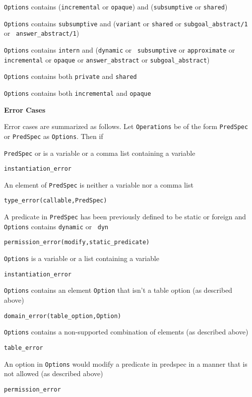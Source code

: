 \begin{description}
\item {\tt Options} contains ({\tt incremental} or {\tt opaque}) and
  ({\tt subsumptive} or {\tt shared})

\item {\tt Options} contains {\tt subsumptive} and ({\tt variant} or
  {\tt shared} or {\tt subgoal\_abstract/1} or {\tt
    answer\_abstract/1})

\item {\tt Options} contains {\tt intern} and ({\tt dynamic} or {\tt
subsumptive} or {\tt approximate} or {\tt incremental} or {\tt opaque}
or {\tt answer\_abstract} or {\tt subgoal\_abstract})
%
\item {\tt Options} contains both {\tt private} and {\tt shared}
%
\item {\tt Options} contains both {\tt incremental} and {\tt opaque}
\ei

{\bf Error Cases}

Error cases are summarized as follows.  Let {\tt Operations} be of the
form {\tt PredSpec} or {\tt PredSpec} as {\tt Options}.  Then if 
%
\bi
\item {\tt PredSpec} or is a variable or a comma list containing a variable
\bi
\item {\tt instantiation\_error}
\ei
\item An element of {\tt PredSpec} is neither a variable nor a comma
  list
\bi
\item 	{\tt type\_error(callable,PredSpec)}
\ei
\item A predicate in {\tt PredSpec} has been previously defined to be
  static or foreign and {\tt Options} contains {\tt dynamic} or {\tt
    dyn}
\bi
\item 	{\tt permission\_error(modify,static\_predicate)}
\ei
\item {\tt Options} is a variable or a list containing a variable
\bi
\item {\tt instantiation\_error}
\ei
\item {\tt Options} contains an element {\tt Option} that isn't a table option (as described above)
\bi
\item {\tt domain\_error(table\_option,Option)}
\ei
\item {\tt Options} contains a non-supported combination of  elements (as described above)
\bi
\item {\tt table\_error}
\ei
\item An option in {\tt Options} would modify a predicate in predspec
  in a manner that is not allowed (as described above)
\bi
\item {\tt permission\_error}
\ei
\ei


\end{description}
